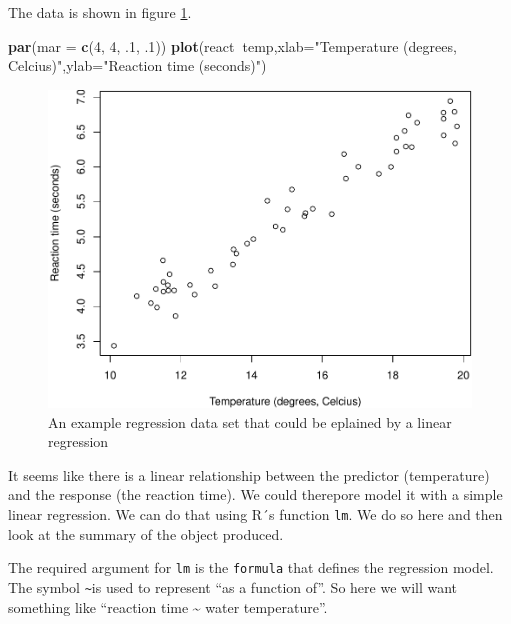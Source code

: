 \documentclass[
]{book}
\newenvironment{Shaded}{\begin{snugshade}}{\end{snugshade}}
\newcommand{\DataTypeTok}[1]{\textcolor[rgb]{0.13,0.29,0.53}{#1}}
\newcommand{\DecValTok}[1]{\textcolor[rgb]{0.00,0.00,0.81}{#1}}
\newcommand{\FloatTok}[1]{\textcolor[rgb]{0.00,0.00,0.81}{#1}}
\newcommand{\KeywordTok}[1]{\textcolor[rgb]{0.13,0.29,0.53}{\textbf{#1}}}
\newcommand{\NormalTok}[1]{#1}
\newcommand{\OperatorTok}[1]{\textcolor[rgb]{0.81,0.36,0.00}{\textbf{#1}}}
\newcommand{\StringTok}[1]{\textcolor[rgb]{0.31,0.60,0.02}{#1}}
\begin{document}
The data is shown in figure \ref{fig:Freg}.

\begin{Shaded}
\begin{Highlighting}[]
\KeywordTok{par}\NormalTok{(}\DataTypeTok{mar =} \KeywordTok{c}\NormalTok{(}\DecValTok{4}\NormalTok{, }\DecValTok{4}\NormalTok{, }\FloatTok{.1}\NormalTok{, }\FloatTok{.1}\NormalTok{))}
\KeywordTok{plot}\NormalTok{(react}\OperatorTok{~}\NormalTok{temp,}\DataTypeTok{xlab=}\StringTok{"Temperature (degrees, Celcius)"}\NormalTok{,}\DataTypeTok{ylab=}\StringTok{"Reaction time (seconds)"}\NormalTok{)}
\end{Highlighting}
\end{Shaded}

\begin{figure}

{\centering \includegraphics[width=0.8\linewidth]{ECOMODbook_files/figure-latex/Freg-1} 

}

\caption{An example regression data set that could be eplained by a linear regression}\label{fig:Freg}
\end{figure}

It seems like there is a linear relationship between the predictor (temperature) and the response (the reaction time). We could therepore model it with a simple linear regression. We can do that using R´s function \texttt{lm}. We do so here and then look at the summary of the object produced.

The required argument for \texttt{lm} is the \texttt{formula} that defines the regression model. The symbol \texttt{\textasciitilde{}}is used to represent ``as a function of''. So here we will want something like ``reaction time \textasciitilde{} water temperature''.
\end{document}
